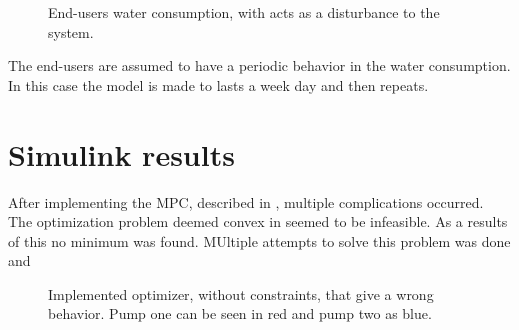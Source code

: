 \begin{figure}[H]
\centering
 
\caption{End-users water consumption, with acts as a disturbance to the system.}
\label{fig:water_consumption}
\end{figure}

The end-users are assumed to have a periodic behavior in the water consumption. In this case the model is made to lasts a week day and then repeats. 


\section{Simulink results}

After implementing the MPC, described in , multiple complications occurred. The optimization problem deemed convex in  seemed to be infeasible. As a results of this no minimum was found. MUltiple attempts to solve this problem was done and 


\begin{figure}[H]
\centering
 
\caption{Implemented optimizer, without constraints, that give a wrong behavior. Pump one can be seen in red and pump two as blue.}
\label{fig:Implementation_shit}
\end{figure}
